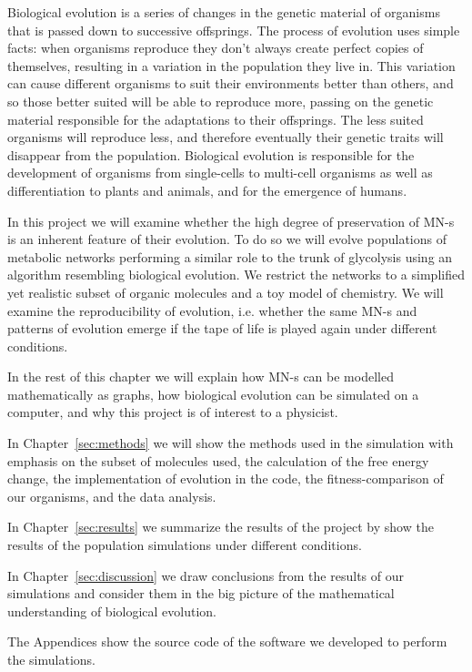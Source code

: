 \documentclass[a4paper,12pt]{article}
\begin{document}
	Biological evolution is a series of changes in the genetic material of organisms that is passed down to successive offsprings. The process of evolution uses simple facts: when organisms reproduce they don't always create perfect copies of themselves, resulting in a variation in the population they live in. This variation can cause different organisms to suit their environments better than others, and so those better suited will be able to reproduce more, passing on the genetic material responsible for the adaptations to their offsprings. The less suited organisms will reproduce less, and therefore eventually their genetic traits will disappear from the population. 
	 Biological evolution is responsible for the development of organisms from single-cells to multi-cell organisms as well as differentiation to plants and animals, and for the emergence of humans. 



	In this project we will examine whether the high degree of preservation of MN-s is an inherent feature of their evolution. To do so we will evolve populations of metabolic networks performing a similar role to the trunk of glycolysis using an algorithm resembling biological evolution. We restrict the networks to a simplified yet realistic subset of organic molecules and a toy model of chemistry. We will examine the reproducibility of evolution, i.e. whether the same MN-s and patterns of evolution emerge if the tape of life is played again under different conditions. 

	In the rest of this chapter we will explain how MN-s can be modelled mathematically as graphs, how biological evolution can be simulated on a computer, and why this project is of interest to a physicist.

	In Chapter~\ref{sec:methods} we will show the methods used in the simulation with emphasis on the subset of molecules used, the calculation of the free energy change, the implementation of evolution in the code, the fitness-comparison of our organisms, and the data analysis. 

	In Chapter~\ref{sec:results} we summarize the results of the project by show the results of the population simulations under different conditions.


	In Chapter~\ref{sec:discussion} we draw conclusions from the results of our simulations and consider them in the big picture of the mathematical understanding of biological evolution. 

	The Appendices show the source code of the software we developed to perform the simulations. 
	
\end{document}
